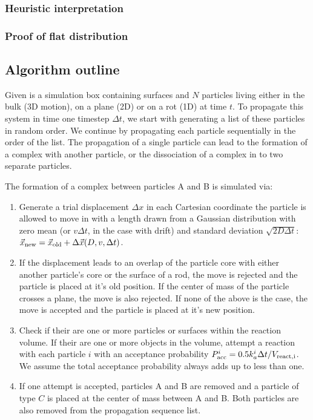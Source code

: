 \subsubsection{Heuristic interpretation}

\subsubsection{Proof of flat distribution}

\subsection{Algorithm outline}

Given is a simulation box containing surfaces and $N$ particles living either in the bulk (3D motion), on a plane (2D) or on a rot (1D) at time $t$. To propagate this system in time one timestep $\Delta t$, we start with generating a list of these particles in random order. We continue by propagating each particle sequentially in the order of the list. The propagation of a single particle can lead to the formation of a complex with another particle, or the dissociation of a complex in to two separate particles. 

The formation of a complex between particles A and B is simulated via:

\begin{enumerate}
\item Generate a trial displacement $\Delta x$ in each Cartesian coordinate the particle is allowed to move in with a length drawn from a Gaussian distribution with zero mean (or $v \Delta t$, in the case with drift) and standard deviation $\sqrt{2D\Delta t}$: $\vec{x}_{\rm new} = \vec{x}_{\rm old} + \Delta \vec{x}(D,v,\Delta t)$.
\item If the displacement leads to an overlap of the particle core with either another particle's core or the surface of a rod, the move is rejected and the particle is placed at it's old position. If the center of mass of the particle crosses a plane, the move is also rejected. If none of the above is the case, the move is accepted and the particle is placed at it's new position.
\item Check if their are one or more particles or surfaces within the reaction volume. If their are one or more objects in the volume, attempt a reaction with each particle $i$ with an acceptance probability $P_{\rm acc}^i = 0.5 k_{a}^i \Delta t/V_{\rm react, i}$. We assume the total acceptance probability always adds up to less than one. 
\item If one attempt is accepted, particles A and B are removed and a particle of type $C$ is placed at the center of mass between A and B. Both particles are also removed from the propagation sequence list. 
\end{enumerate}

